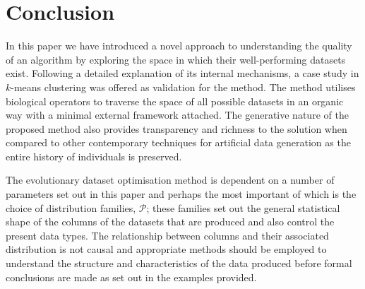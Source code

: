 \section{Conclusion}

In this paper we have introduced a novel approach to understanding the quality
of an algorithm by exploring the space in which their well-performing datasets
exist. Following a detailed explanation of its internal mechanisms, a case study
in \(k\)-means clustering was offered as validation for the method. The method
utilises biological operators to traverse the space of all possible datasets in
an organic way with a minimal external framework attached. The generative nature
of the proposed method also provides transparency and richness to the solution
when compared to other contemporary techniques for artificial data generation as
the entire history of individuals is preserved.

The evolutionary dataset optimisation method is dependent on a number of
parameters set out in this paper and perhaps the most important of which is the
choice of distribution families, \(\mathcal{P}\); these families set out the
general statistical shape of the columns of the datasets that are produced and
also control the present data types. The relationship between columns and their
associated distribution is not causal and appropriate methods should be
employed to understand the structure and characteristics of the data produced
before formal conclusions are made as set out in the examples provided.

